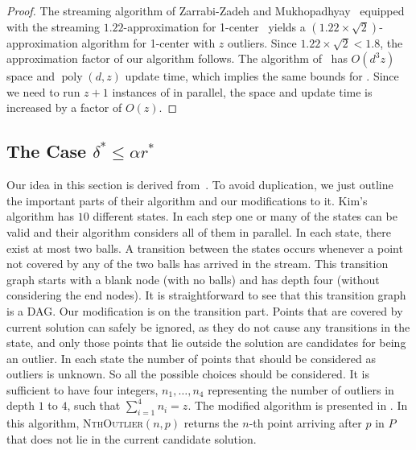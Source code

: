 \documentclass[envcountsame]{cls/cccg15}
\newcommand{\textproc}{\textsc}
\newcommand{\poly}{\mathop{\mathrm{poly}}}
\newcommand{\lee}{\leqslant}
\renewcommand{\leq}{\lee}
\begin{document}
\begin{proof}
The streaming algorithm of Zarrabi-Zadeh and Mukhopadhyay~\cite{zarrabi2009streaming} 
equipped with the streaming $1.22$-approximation for 
1-center~\cite{agarwal2010streaming, chan2014streaming}
yields a $(1.22 \times \sqrt{2})$-approximation algorithm
for 1-center with $z$ outliers.
Since $1.22 \times \sqrt{2} < 1.8$, the approximation factor of our algorithm follows.
The algorithm of~\cite{zarrabi2009streaming}
has $O(d^3z)$ space and $\poly(d,z)$ update time,
which implies the same bounds for .
Since we need to run $z + 1$ instances of  in parallel, 
the space and update time is increased by a factor of $O(z)$.
\end{proof}



\subsection{The Case $\delta^* \leq \alpha r^*$}
\label{subsec:smaller}
Our idea in this section is derived from~\cite{ahn2014computing, kim2014improved}. To avoid duplication, we just outline the important parts of their algorithm and our modifications to it. Kim's algorithm has $10$ different states. In each step one or many of the states can be valid and their algorithm considers all of them in parallel. In each state, there exist at most two balls. A transition between the states occurs whenever a point not covered by any of the two balls has arrived in the stream. This transition graph starts with a blank node (with no balls) and has depth four (without considering the end nodes). It is straightforward to see that this transition graph is a DAG.
Our modification is on the transition part.
Points that are covered by current solution can safely be ignored, as they do not cause any transitions in the state, and only those points that lie outside the solution are candidates for being an outlier.
In each state the number of points that should be considered as outliers is unknown. So all the possible choices should be considered. It is sufficient to have four integers, $n_1,\dots, n_4$ representing the number of outliers in depth $1$ to $4$, such that $\sum_{i=1}^{4} n_i=z$. 
The modified algorithm is presented in .
In this algorithm, \textproc{NthOutlier}$(n,p)$ returns the $n$-th point 
arriving after $p$ in $P$ that does not lie in the current candidate solution.
\end{document}
